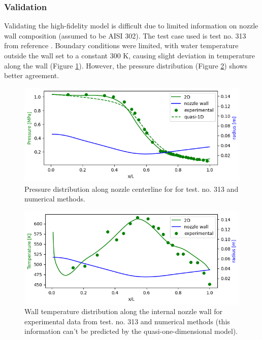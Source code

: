 \documentclass[10pt,fleqn,a4paper,twoside]{article}
\begin{document}
\subsubsection{Validation}

Validating the high-fidelity model is difficult due to limited information on nozzle wall composition (assumed to be AISI 302). The test case used is test no. 313 from reference \cite{Back1964ConvectiveHT}. Boundary conditions were limited, with water temperature outside the wall set to a constant 300 K, causing slight deviation in temperature along the wall (Figure \ref{fig:validationtemperature}). However, the pressure distribution (Figure \ref{fig:validationpressure}) shows better agreement.

\begin{figure}[]
	\begin{center}
		\includegraphics[]{images/validation_2d_2.png}
		\caption{Pressure distribution along nozzle centerline for for test. no. 313  \cite{Back1964ConvectiveHT} and numerical methods. }
        \label{fig:validationtemperature}
	\end{center} 
\end{figure}

\begin{figure}[]
	\begin{center}
		\includegraphics[]{images/validation_2d_1.png}
		\caption{Wall temperature distribution along the internal nozzle wall for experimental data from test. no. 313 \cite{Back1964ConvectiveHT} and numerical methods (this information can't be predicted by the quasi-one-dimensional model).}
        \label{fig:validationpressure}
	\end{center} 
\end{figure}
\end{document}
